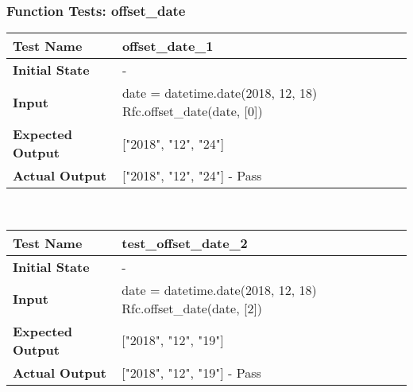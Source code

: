 \documentclass[12pt, titlepage]{article}
\begin{document}
        \subsubsection{Function Tests: offset\_date}
        \begin{table}[!htbp]
			\begin{tabularx}{\textwidth}{|l|X|}%
				\hline
                \textbf{Test Name} & offset\_date\_1  
                \\\hline
                \textbf{Initial State} & -
                \\\hline
                \textbf{Input} & date = datetime.date(2018, 12, 18) \newline Rfc.offset\_date(date, [0])
                \\\hline 
                \textbf{Expected Output} & ["2018", "12", "24"]
                \\\hline
                \textbf{Actual Output} & ["2018", "12", "24"] - Pass
                \\\hline

            \end{tabularx}\\ %
    	\end{table}	
            \hfill	%
		\begin{table}[!htbp] 	    
			\begin{tabularx}{\textwidth}{|l|X|}%
				\hline
                \textbf{Test Name} & test\_offset\_date\_2  
                \\\hline
                \textbf{Initial State} & -
                \\\hline
                \textbf{Input} & date = datetime.date(2018, 12, 18) \newline Rfc.offset\_date(date, [2])
                \\\hline 
                \textbf{Expected Output} & ["2018", "12", "19"]
                \\\hline
                \textbf{Actual Output} & ["2018", "12", "19"] - Pass
                \\\hline
			\end{tabularx}\\ %
    	\end{table}	
            \hfill	%
\end{document}
